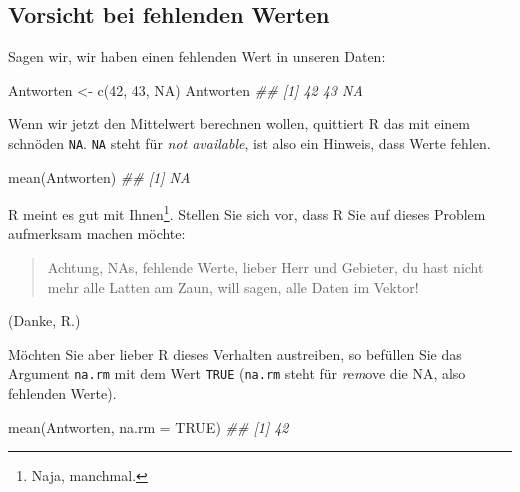 \documentclass[
  letterpaper,
  oneside,
  open=any]{scrbook}
\newenvironment{Shaded}{\begin{snugshade}}{\end{snugshade}}
\newcommand{\AttributeTok}[1]{\textcolor[rgb]{0.40,0.45,0.13}{#1}}
\newcommand{\ConstantTok}[1]{\textcolor[rgb]{0.56,0.35,0.01}{#1}}
\newcommand{\DecValTok}[1]{\textcolor[rgb]{0.68,0.00,0.00}{#1}}
\newcommand{\DocumentationTok}[1]{\textcolor[rgb]{0.37,0.37,0.37}{\textit{#1}}}
\newcommand{\FunctionTok}[1]{\textcolor[rgb]{0.28,0.35,0.67}{#1}}
\newcommand{\NormalTok}[1]{\textcolor[rgb]{0.00,0.23,0.31}{#1}}
\newcommand{\OtherTok}[1]{\textcolor[rgb]{0.00,0.23,0.31}{#1}}
\theoremstyle{definition}
\theoremstyle{definition}
\theoremstyle{definition}
\theoremstyle{remark}
\begin{document}
\subsection{Vorsicht bei fehlenden
Werten}\label{vorsicht-bei-fehlenden-werten}

Sagen wir, wir haben einen fehlenden Wert in unseren Daten:

\begin{Shaded}
\begin{Highlighting}[]
\NormalTok{Antworten }\OtherTok{\textless{}{-}} \FunctionTok{c}\NormalTok{(}\DecValTok{42}\NormalTok{, }\DecValTok{43}\NormalTok{, }\ConstantTok{NA}\NormalTok{)}
\NormalTok{Antworten}
\DocumentationTok{\#\# [1] 42 43 NA}
\end{Highlighting}
\end{Shaded}

Wenn wir jetzt den Mittelwert berechnen wollen, quittiert R das mit
einem schnöden \texttt{NA}. \texttt{NA} steht für \emph{not available},
ist also ein Hinweis, dass Werte fehlen.

\begin{Shaded}
\begin{Highlighting}[]
\FunctionTok{mean}\NormalTok{(Antworten)}
\DocumentationTok{\#\# [1] NA}
\end{Highlighting}
\end{Shaded}

R meint es gut mit Ihnen\footnote{{} Naja, manchmal.}.
Stellen Sie sich vor, dass R Sie auf dieses Problem aufmerksam machen
möchte:

\begin{quote}
{} Achtung, NAs, fehlende Werte, lieber Herr und Gebieter,
du hast nicht mehr alle Latten am Zaun, will sagen, alle Daten im
Vektor!
\end{quote}

(Danke, R.)

Möchten Sie aber lieber R dieses Verhalten austreiben, so befüllen Sie
das Argument \texttt{na.rm} mit dem Wert \texttt{TRUE} (\texttt{na.rm}
steht für \emph{r}e\emph{m}ove die NA, also fehlenden Werte).

\begin{Shaded}
\begin{Highlighting}[]
\FunctionTok{mean}\NormalTok{(Antworten, }\AttributeTok{na.rm =} \ConstantTok{TRUE}\NormalTok{)}
\DocumentationTok{\#\# [1] 42}
\end{Highlighting}
\end{Shaded}
\end{document}
